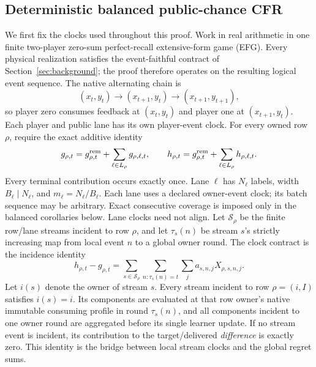 \subsection{Deterministic balanced public-chance CFR}
\label{app:balanced-cfr-proof}

We first fix the clocks used throughout this proof.  Work in real arithmetic
in one finite two-player zero-sum perfect-recall extensive-form game (EFG).
Every physical realization satisfies the event-faithful contract of
Section~\ref{sec:background}; the proof therefore operates on the resulting
logical event sequence.  The native alternating
chain is
\begin{equation}
(x_t,y_t)\longrightarrow(x_{t+1},y_t)
\longrightarrow(x_{t+1},y_{t+1}),
\label{eq:app-alternating-chain}
\end{equation}
so player zero consumes feedback at $(x_t,y_t)$ and player one at
$(x_{t+1},y_t)$.  Each player and public lane has its own player-event clock.
For every owned row $\rho$, require the exact additive identity
\begin{equation}
g_{\rho,t}=g^{\rm rem}_{\rho,t}+\sum_{\ell\in L_\rho}g_{\rho,\ell,t},
\qquad
h_{\rho,t}=g^{\rm rem}_{\rho,t}+\sum_{\ell\in L_\rho}h_{\rho,\ell,t}.
\label{eq:app-additive-lanes}
\end{equation}
Every terminal contribution occurs exactly once.  Lane $\ell$ has
$N_\ell$ labels, width $B_\ell\mid N_\ell$, and
$m_\ell=N_\ell/B_\ell$.  Each lane uses a declared owner-event clock; its
batch sequence may be arbitrary.  Exact consecutive coverage is imposed only
in the balanced corollaries below.  Lane clocks need not align.  Let
$\mathcal S_\rho$ be the finite row/lane streams incident to row $\rho$, and
let $\tau_s(n)$ be stream $s$'s strictly increasing map from local
event $n$ to a global owner round.  The clock contract is the incidence
identity
\begin{equation}
h_{\rho,t}-g_{\rho,t}
=\sum_{s\in\mathcal S_\rho}\sum_{n:\tau_s(n)=t}\sum_j
a_{s,n,j}X_{\rho,s,n,j}.
\label{eq:app-stream-incidence}
\end{equation}
Let $i(s)$ denote the owner of stream $s$.  Every stream incident to row
$\rho=(i,I)$ satisfies $i(s)=i$.  Its components
are evaluated at that row owner's native immutable consuming profile in round
$\tau_s(n)$, and all components incident to one
owner round are aggregated before its single learner update.  If no stream
event is incident, its contribution to the target/delivered \emph{difference}
is exactly zero.  This identity is the bridge between local stream clocks and
the global regret sums.

